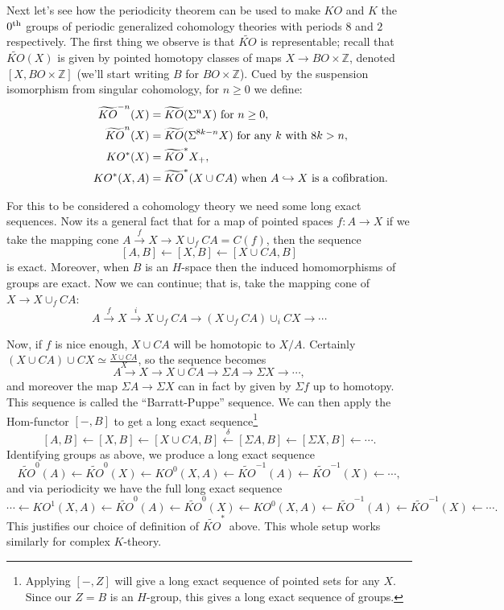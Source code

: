 \documentclass{article}
\newcommand{\Z}{\mathbb{Z}}
\newcommand{\Suspend}{\Sigma}
\newcommand{\from}{\leftarrow}
\renewcommand{\to}{\longrightarrow}
\theoremstyle{definition}
\begin{document}
Next let's see how the periodicity theorem can be used to make $KO$ and $K$ the $0^\textup{th}$ groups of periodic generalized cohomology theories with periods $8$ and $2$ respectively.  The first thing we observe is that $\widetilde{KO}$ is representable; recall that $\widetilde{KO}(X)$ is given by pointed homotopy classes of maps $X \to BO \times \Z$, denoted $[X, BO \times \Z]$ (we'll start writing $B$ for $BO \times \Z$).  Cued by the suspension isomorphism from singular cohomology, for $n \ge 0$ we define:
\begin{align*}
\qquad\qquad\qquad
\widetilde{KO}^{-n} (X) & = \widetilde{KO}(\Suspend^n X)\hbox{\ for $n\geq0$}, \\
\widetilde{KO}^n(X) & = \widetilde{KO}(\Suspend^{8k-n}X) \hbox{\ for any $k$ with $8k > n$}, \\
KO^*(X) &= \widetilde{KO}^* X_+, \\
KO^*(X, A) & = \widetilde{KO}^*(X \cup CA) \textup{\ when $A\hookrightarrow X$ is a cofibration.}
\end{align*}

For this to be considered a cohomology theory we need some long exact sequences.  Now its a general fact that for a map of pointed spaces $f: A \to X$ if we take the mapping cone $A \stackrel{f}{\to} X \to X \cup_f CA = C(f)$, then the sequence
\[
[A, B] \from [X, B] \from [X \cup CA, B]
\]
is exact.  Moreover, when $B$ is an $H$-space then the induced homomorphisms of groups are exact.  Now we can continue; that is, take the mapping cone of $X \to X \cup_f CA$:
\[
A \stackrel{f}{\to} X \stackrel{i}{\to} X \cup_f CA \to (X \cup_f CA) \cup_i CX \to \cdots
\]

Now, if $f$ is nice enough, $X \cup CA$ will be homotopic to $X / A$.  Certainly $(X \cup CA) \cup CX \simeq \frac{X \cup CA}{X}$, so the sequence becomes
\[
A \to X \to X \cup CA \to \Suspend A \to \Suspend X \to \cdots
,\]
and moreover the map $\Suspend A \to \Suspend X$ can in fact by given by $\Sigma f$ up to homotopy.  This sequence is called the ``Barratt-Puppe'' sequence.  We can then apply the Hom-functor $[-, B]$ to get a long exact sequence\footnote{Applying $[-, Z]$ will give a long exact sequence of pointed sets for any $X$.  Since our $Z = B$ is an $H$-group, this gives a long exact sequence of groups.}
\[
[A, B] \from [X, B] \from [X \cup CA, B] \stackrel{\delta}{\from} [\Suspend A, B] \from [\Suspend X, B] \from \cdots
.\]
Identifying groups as above, we produce a long exact sequence
\[
\widetilde{KO}^0 (A) \from \widetilde{KO}^0(X) \from KO^0(X, A) \from \widetilde{KO}^{-1}(A) \from \widetilde{KO}^{-1}(X) \from \cdots
,\]
and via periodicity we have the full long exact sequence
\[
\cdots \from KO^1(X, A) \from \widetilde{KO}^0 (A) \from \widetilde{KO}^0(X) \from KO^0(X, A) \from \widetilde{KO}^{-1}(A) \from \widetilde{KO}^{-1}(X) \from \cdots
.\]
This justifies our choice of definition of $\widetilde{KO}^*$ above.  This whole setup works similarly for complex $K$-theory.
\end{document}
